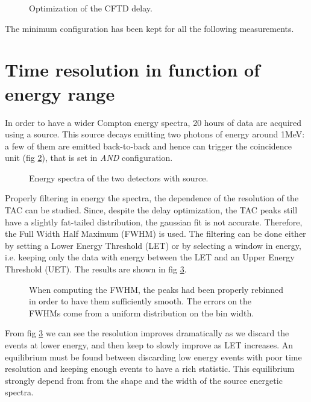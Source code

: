\documentclass[11pt,a4 paper]{article}
\begin{document}
\begin{figure}[H]
    \centering
    \caption{Optimization of the CFTD delay.}
    \label{fig:CFTD:delay}
\end{figure}

The minimum configuration has been kept for all the following measurements.

\section{Time resolution in function of energy range} \label{sec:Co}
In order to have a wider Compton energy spectra, 20 hours of data are acquired using a  source. This source decays emitting two photons of energy around 1\si{\mega\electronvolt}: a few of them are emitted back-to-back and hence can trigger the coincidence unit (fig \ref{fig:Co:spectra}), that is set in \emph{AND} configuration.


\begin{figure}[H]
    \centering
    \caption{Energy spectra of the two detectors with  source.}
    \label{fig:Co:spectra}
\end{figure}

Properly filtering in energy the spectra, the dependence of the resolution of the TAC can be studied. Since, despite the delay optimization, the TAC peaks still have a slightly fat-tailed distribution, the gaussian fit is not accurate. Therefore, the Full Width Half Maximum (FWHM) is used.
The filtering can be done either by setting a Lower Energy Threshold (LET) or by selecting a window in energy, i.e. keeping only the data with energy between the LET and an Upper Energy Threshold (UET). The results are shown in fig \ref{fig:Co:results}.

\begin{figure}[H]
    \centering
    \caption{When computing the FWHM, the peaks had been properly rebinned in order to have them sufficiently smooth. The errors on the FWHMs come from a uniform distribution on the bin width.}
    \label{fig:Co:results}
\end{figure}

From fig \ref{fig:Co:results} we can see the resolution improves dramatically as we discard the events at lower energy, and then keep to slowly improve as LET increases. An equilibrium must be found between discarding low energy events with poor time resolution and keeping enough events to have a rich statistic. This equilibrium strongly depend from from the shape and the width of the source energetic spectra.
\end{document}
